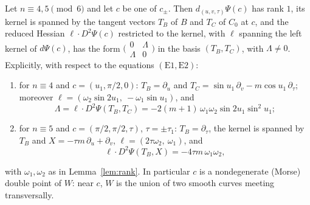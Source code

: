 \begin{proposition}\label{prop:doublepoints}
Let $n\equiv4,5\pmod6$ and let $c$ be one of $c_\pm$. Then $d_{(u,v,\tau)}\Psi(c)$ has rank $1$, its kernel is
spanned by the tangent vectors $T_B$ of $B$ and $T_C$ of $C_0$ at $c$, and the reduced Hessian
$\ell\cdot D^2\Psi(c)$ restricted to the kernel, with $\ell$ spanning the left kernel of $d\Psi(c)$, has the form
$\bigl(\begin{smallmatrix}0&\Lambda\\\Lambda&0\end{smallmatrix}\bigr)$ in the basis $(T_B,T_C)$, with $\Lambda\neq0$. Explicitly, with
respect to the equations $(\mathrm{E1},\mathrm{E2})$:
\begin{enumerate}
\item for $n\equiv4$ and $c=(u_1,\pi/2,0)$: $T_B=\partial_u$ and $T_C=\sin u_1\,\partial_v-m\cos u_1\,\partial_\tau$;
moreover $\ell=(\omega_2\sin2u_1,\ -\omega_1\sin u_1)$, and
\[
\Lambda=\ell\cdot D^2\Psi(T_B,T_C)=-2(m+1)\,\omega_1\omega_2\sin2u_1\sin^2u_1;
\]
\item for $n\equiv5$ and $c=(\pi/2,\pi/2,\tau)$, $\tau=\pm\tau_1$: $T_B=\partial_\tau$, the kernel is spanned by $T_B$ and
$X=-\tau m\,\partial_u+\partial_v$, $\ell=(2\tau\omega_2,\ \omega_1)$, and
\[
\ell\cdot D^2\Psi(T_B,X)=-4\tau m\,\omega_1\omega_2 ,
\]
\end{enumerate}
with $\omega_1,\omega_2$ as in Lemma~\ref{lem:rank}. In particular $c$ is a nondegenerate (Morse) double point of $W$: near $c$,
$W$ is the union of two smooth curves meeting transversally.
\end{proposition}

